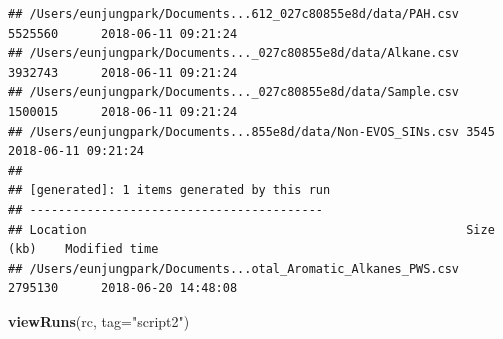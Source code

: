 \documentclass[]{article}
\newenvironment{Shaded}{\begin{snugshade}}{\end{snugshade}}
\newcommand{\DataTypeTok}[1]{\textcolor[rgb]{0.13,0.29,0.53}{#1}}
\newcommand{\KeywordTok}[1]{\textcolor[rgb]{0.13,0.29,0.53}{\textbf{#1}}}
\newcommand{\NormalTok}[1]{#1}
\newcommand{\StringTok}[1]{\textcolor[rgb]{0.31,0.60,0.02}{#1}}
\begin{document}
\begin{verbatim}
## /Users/eunjungpark/Documents...612_027c80855e8d/data/PAH.csv 5525560      2018-06-11 09:21:24
## /Users/eunjungpark/Documents..._027c80855e8d/data/Alkane.csv 3932743      2018-06-11 09:21:24
## /Users/eunjungpark/Documents..._027c80855e8d/data/Sample.csv 1500015      2018-06-11 09:21:24
## /Users/eunjungpark/Documents...855e8d/data/Non-EVOS_SINs.csv 3545         2018-06-11 09:21:24
## 
## [generated]: 1 items generated by this run
## -----------------------------------------
## Location                                                     Size (kb)    Modified time      
## /Users/eunjungpark/Documents...otal_Aromatic_Alkanes_PWS.csv 2795130      2018-06-20 14:48:08
\end{verbatim}

\begin{Shaded}
\begin{Highlighting}[]
\KeywordTok{viewRuns}\NormalTok{(rc, }\DataTypeTok{tag=}\StringTok{"script2"}\NormalTok{)}
\end{Highlighting}
\end{Shaded}
\end{document}
